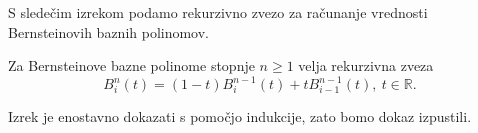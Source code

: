 \documentclass[isrm2, tisk]{fmfdelo}
\newcommand{\R}{\mathbb R}
\begin{document}
    S sledečim izrekom podamo rekurzivno zvezo za računanje vrednosti Bernsteinovih baznih polinomov.
    \begin{izrek}
        \label{izrek:bernsteinovi_lastnosti:rekruzija}
        Za Bernsteinove bazne polinome stopnje $n\geq1$ velja rekurzivna zveza
        \[B_i^n(t) = (1-t)B_i^{n-1}(t) + tB_{i-1}^{n-1}(t),\ t\in\R.\]
    \end{izrek}
    \noindent Izrek je enostavno dokazati s pomočjo indukcije, zato bomo dokaz izpustili.
\end{document}
